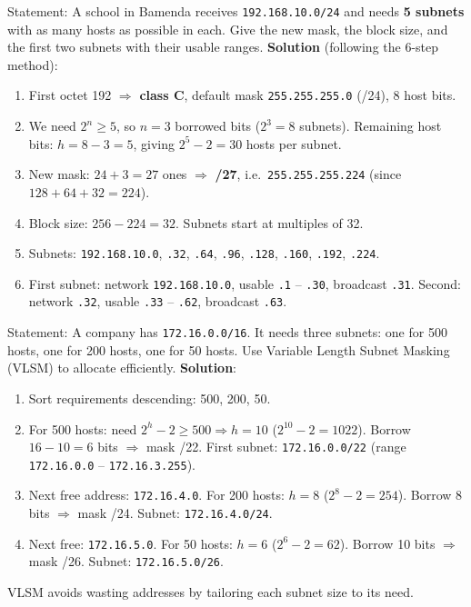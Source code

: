 \documentclass[11pt]{article}
\begin{document}
\begin{exoresolu}
Statement: A school in Bamenda receives \texttt{192.168.10.0/24} and needs \textbf{5 subnets} with as many hosts as possible in each. Give the new mask, the block size, and the first two subnets with their usable ranges.
\tcblower
\textbf{Solution} (following the 6-step method):
\begin{enumerate}
\item First octet 192 $\Rightarrow$ \textbf{class C}, default mask \texttt{255.255.255.0} (/24), 8 host bits.
\item We need $2^{n} \geq 5$, so $n = 3$ borrowed bits ($2^3 = 8$ subnets). Remaining host bits: $h = 8 - 3 = 5$, giving $2^5 - 2 = 30$ hosts per subnet.
\item New mask: $24 + 3 = 27$ ones $\Rightarrow$ \textbf{/27}, i.e.\ \texttt{255.255.255.224} (since $128+64+32 = 224$).
\item Block size: $256 - 224 = 32$. Subnets start at multiples of 32.
\item Subnets: \texttt{192.168.10.0}, \texttt{.32}, \texttt{.64}, \texttt{.96}, \texttt{.128}, \texttt{.160}, \texttt{.192}, \texttt{.224}.
\item First subnet: network \texttt{192.168.10.0}, usable \texttt{.1} -- \texttt{.30}, broadcast \texttt{.31}. Second: network \texttt{.32}, usable \texttt{.33} -- \texttt{.62}, broadcast \texttt{.63}.
\end{enumerate}
\end{exoresolu}

\begin{exoresolu}
Statement: A company has \texttt{172.16.0.0/16}. It needs three subnets: one for 500 hosts, one for 200 hosts, one for 50 hosts. Use Variable Length Subnet Masking (VLSM) to allocate efficiently.
\tcblower
\textbf{Solution}:
\begin{enumerate}
\item Sort requirements descending: 500, 200, 50.
\item For 500 hosts: need $2^h - 2 \geq 500 \Rightarrow h = 10$ ($2^{10}-2=1022$). Borrow $16-10=6$ bits $\Rightarrow$ mask /22. First subnet: \texttt{172.16.0.0/22} (range \texttt{172.16.0.0} -- \texttt{172.16.3.255}).
\item Next free address: \texttt{172.16.4.0}. For 200 hosts: $h=8$ ($2^8-2=254$). Borrow 8 bits $\Rightarrow$ mask /24. Subnet: \texttt{172.16.4.0/24}.
\item Next free: \texttt{172.16.5.0}. For 50 hosts: $h=6$ ($2^6-2=62$). Borrow 10 bits $\Rightarrow$ mask /26. Subnet: \texttt{172.16.5.0/26}.
\end{enumerate}
VLSM avoids wasting addresses by tailoring each subnet size to its need.
\end{exoresolu}
\end{document}
